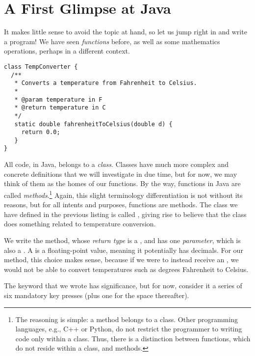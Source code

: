\section{A First Glimpse at Java}
It makes little sense to avoid the topic at hand, so let us jump right in and write a program! We have seen \textit{functions} before, as well as some mathematics operations, perhaps in a different context. 


\begin{cl}{}
\begin{lstlisting}[language=MyJava]
class TempConverter {
  /**
   * Converts a temperature from Fahrenheit to Celsius.
   * 
   * @param temperature in F
   * @return temperature in C
   */
   static double fahrenheitToCelsius(double d) {
     return 0.0;
   }
}
\end{lstlisting}
\end{cl}

All code, in Java, belongs to a \textit{class}. Classes have much more complex and concrete definitions that we will investigate in due time, but for now, we may think of them as the homes of our functions. By the way, functions in Java are called \textit{methods}.\footnote{The reasoning is simple: a method belongs to a class. Other programming languages, e.g., C++ or Python, do not restrict the programmer to writing code only within a class. Thus, there is a distinction between functions, which do not reside within a class, and methods.} Again, this slight terminology differentiation is not without its reasons, but for all intents and purposes, functions are methods. The class we have defined in the previous listing is called , giving rise to believe that the class does something related to temperature conversion.

We write the  method, whose \textit{return type} is a , and has one \textit{parameter}, which is also a . A  is a floating-point value, meaning it potentially has decimals. For our method, this choice makes sense, because if we were to instead receive an , we would not be able to convert temperatures such as  degrees Fahrenheit to Celsius. 

The  keyword that we wrote has significance, but for now, consider it a series of six mandatory key presses (plus one for the space thereafter).

